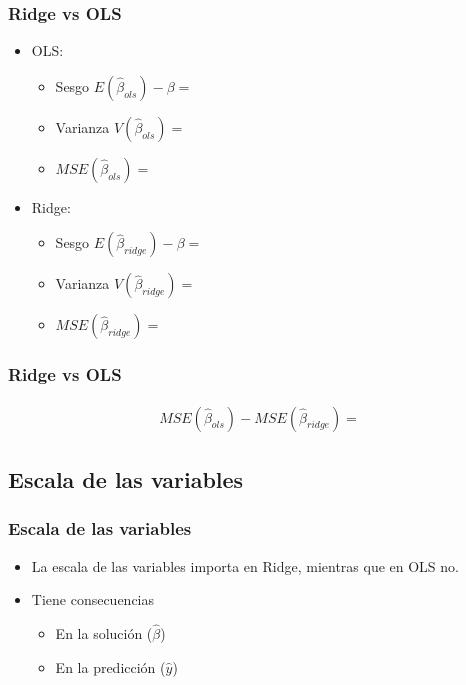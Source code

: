 \documentclass[
  shownotes,
  xcolor={svgnames},
  hyperref={colorlinks,citecolor=DarkBlue,linkcolor=andesred,urlcolor=DarkBlue}
  , aspectratio=169]{beamer}
\begin{document}
\begin{frame}[fragile]
\frametitle{Ridge vs OLS}

\begin{itemize}
    \item OLS:
    \begin{itemize}
        \item Sesgo $E(\hat{\beta}_{ols})-\beta=$
        \medskip
        \item Varianza $V(\hat{\beta}_{ols})=$
        \medskip
        \item $MSE(\hat{\beta}_{ols})=$
    \end{itemize}
    \bigskip
\item Ridge:
    \begin{itemize}
        \item Sesgo $E(\hat{\beta}_{ridge})-\beta=$
        \medskip
        \item Varianza $V(\hat{\beta}_{ridge})=$
        \medskip
        \item $MSE(\hat{\beta}_{ridge})=$
    \end{itemize}
\end{itemize}

\end{frame}


\begin{frame}[t]
\frametitle{Ridge vs OLS}
\begin{align}
MSE(\hat{\beta}_{ols})-MSE(\hat{\beta}_{ridge})=
\end{align}


\end{frame}
\subsection{Escala de las variables}
\begin{frame}[fragile]
\frametitle{Escala de las variables}

\begin{itemize}
\item La escala de las variables importa en Ridge, mientras que en OLS no.
\medskip
\item Tiene consecuencias 
\begin{itemize}
    \medskip
    \item En  la solución ($\hat{\beta}$)
    \medskip
    \item En la predicción ($\hat{y}$)
\end{itemize}
\end{itemize}

\end{frame}
\end{document}

